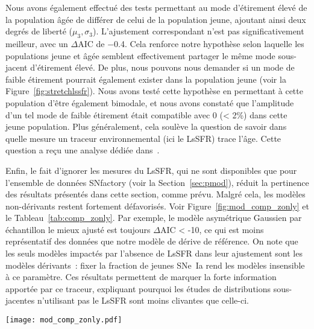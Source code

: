 \documentclass[../main/main.tex]{subfiles}
\begin{document}
Nous avons également effectué des tests permettant au mode d'étirement élevé de
la population âgée de différer de celui de la population jeune, ajoutant ainsi
deux degrés de liberté ($\mu_3, \sigma_3$). L'ajustement correspondant n'est pas
significativement meilleur, avec un $\Delta$AIC de \num{-0.4}. Cela renforce
notre hypothèse selon laquelle les populations jeune et âgée semblent
effectivement partager le même mode sous-jacent d'étirement élevé. De plus, nous
pouvons nous demander si un mode de faible étirement pourrait également exister
dans la population jeune (voir la Figure~\ref{fig:stretchlssfr}). Nous avons
testé cette hypothèse en permettant à cette population d'être également
bimodale, et nous avons constaté que l'amplitude d'un tel mode de faible
étirement était compatible avec 0 (< 2\%) dans cette jeune population. Plus
généralement, cela soulève la question de savoir dans quelle mesure un traceur
environnemental (ici le LsSFR) trace l'âge. Cette question a reçu une analyse
dédiée dans~\cite{briday2022}.

Enfin, le fait d'ignorer les mesures du LsSFR, qui ne sont disponibles que pour
l'ensemble de données SNfactory (voir la Section~\ref{sec:pmod}), réduit la
pertinence des résultats présentés dans cette section, comme prévu. Malgré cela,
les modèles non-dérivants restent fortement défavorisés. Voir
Figure~\ref{fig:mod_comp_zonly} et le Tableau~\ref{tab:comp_zonly}. Par exemple,
le modèle asymétrique Gaussien par échantillon le mieux ajusté est toujours
$\Delta$AIC < -10, ce qui est moins représentatif des données que notre modèle
de dérive de référence. On note que les seuls modèles impactés par l'absence de
LsSFR dans leur ajustement sont les modèles dérivants~: fixer la fraction de
jeunes SNe~Ia rend les modèles insensible à ce paramètre. Ces résultats
permettent de marquer la forte information apportée par ce traceur, expliquant
pourquoi les études de distributions sous-jacentes n'utilisant pas le LsSFR sont
moins clivantes que celle-ci.

\begin{SCfigure}[0.8][ht]
    \centering
    \texttt{[image: mod\_comp\_zonly.pdf]}
    \caption[$\Delta$AIC entre le modèle de base et les autres modèles sans
    utiliser le LsSFR]{$\Delta$AIC entre le modèle de référence et les autres
        modèles sans utiliser le LsSFR (voir Tableau~\ref{tab:comp_zonly}). La
        légende est la même qu'en Figure~\ref{fig:mod_comp}. En revanche, la
        robustesse des résultats concernant l'inaptitude des modèles
        non-dérivants à représenter correctement les données diminue, même si
        les meilleurs modèles sont toujours ceux incluant une dérive (marqueurs
    pleins).}\label{fig:mod_comp_zonly}
\end{SCfigure}
\end{document}
